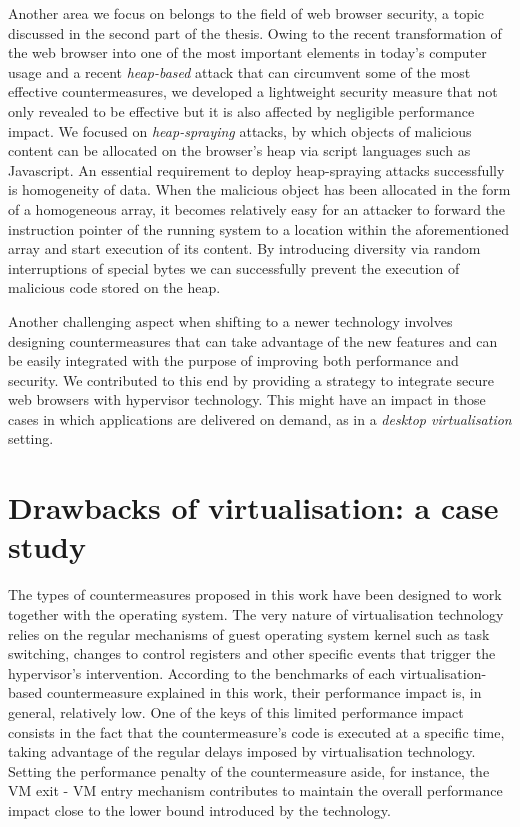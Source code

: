 Another area we focus on belongs to the field of web browser security, a topic discussed in the second part of the thesis.
Owing to the recent transformation of the web browser into one of the most important elements in today's computer 
usage and a recent \emph{heap-based} attack that can circumvent some of the most effective countermeasures, we developed a lightweight security measure that not only revealed to be effective but it is also affected by negligible performance impact. We focused on \emph{heap-spraying} attacks, by which objects of malicious content can be allocated on the browser's heap via script languages such as Javascript. An essential requirement to deploy heap-spraying attacks successfully is homogeneity of data. When the malicious object has been allocated in the form of a homogeneous array, it becomes relatively easy for an attacker to forward the instruction pointer of the running system to a location within the aforementioned array and start execution of its content.
By introducing diversity via random interruptions of special bytes we can successfully prevent the execution of malicious code stored on the heap. 

Another challenging aspect when shifting to a newer technology involves designing countermeasures that can take 
advantage of the new features and can be easily integrated with the purpose of improving both performance and security. We contributed to this end by providing a strategy to integrate secure web browsers with hypervisor technology. This might have an impact in those cases in which applications are delivered on demand, as in a \emph{desktop virtualisation} setting.



\section{Drawbacks of virtualisation: a case study}\label{virt:drawback}
The types of countermeasures proposed in this work have been designed to work together with the operating system.  The very nature of virtualisation technology relies on the regular mechanisms of guest operating system kernel such as task switching, changes to control registers and other specific events that trigger the hypervisor's intervention.
According to the benchmarks of each virtualisation-based countermeasure explained in this work, their performance impact is, in general, relatively low. One of the keys of this limited performance impact consists in the fact that the countermeasure's code is executed at a specific time, taking advantage of the regular delays imposed by virtualisation technology. Setting the performance penalty of the countermeasure aside, for instance, the VM exit - VM entry mechanism contributes to maintain the overall performance impact close to the lower bound introduced by the technology. 

